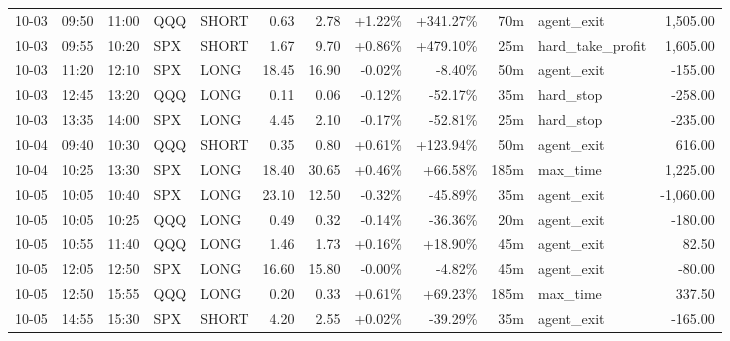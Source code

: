 \documentclass[11pt,a4paper,twoside]{article}
\begin{document}
\begin{center}
\begin{longtable}{>{\color{txtmain}}l l l l l r r r r r >{\color{txtmain}}l r}
10-03 & 09:50 & 11:00 & QQQ & SHORT & 0.63 & 2.78 & \textcolor{wingreen}{+1.22\%} & \textcolor{wingreen}{+341.27\%} & 70m & agent\_exit & \textcolor{wingreen}{1,505.00} \\
10-03 & 09:55 & 10:20 & SPX & SHORT & 1.67 & 9.70 & \textcolor{wingreen}{+0.86\%} & \textcolor{wingreen}{+479.10\%} & 25m & hard\_take\_profit & \textcolor{wingreen}{1,605.00} \\
10-03 & 11:20 & 12:10 & SPX & LONG & 18.45 & 16.90 & \textcolor{lossred}{-0.02\%} & \textcolor{lossred}{-8.40\%} & 50m & agent\_exit & \textcolor{lossred}{-155.00} \\
10-03 & 12:45 & 13:20 & QQQ & LONG & 0.11 & 0.06 & \textcolor{lossred}{-0.12\%} & \textcolor{lossred}{-52.17\%} & 35m & hard\_stop & \textcolor{lossred}{-258.00} \\
10-03 & 13:35 & 14:00 & SPX & LONG & 4.45 & 2.10 & \textcolor{lossred}{-0.17\%} & \textcolor{lossred}{-52.81\%} & 25m & hard\_stop & \textcolor{lossred}{-235.00} \\
10-04 & 09:40 & 10:30 & QQQ & SHORT & 0.35 & 0.80 & \textcolor{wingreen}{+0.61\%} & \textcolor{wingreen}{+123.94\%} & 50m & agent\_exit & \textcolor{wingreen}{616.00} \\
10-04 & 10:25 & 13:30 & SPX & LONG & 18.40 & 30.65 & \textcolor{wingreen}{+0.46\%} & \textcolor{wingreen}{+66.58\%} & 185m & max\_time & \textcolor{wingreen}{1,225.00} \\
10-05 & 10:05 & 10:40 & SPX & LONG & 23.10 & 12.50 & \textcolor{lossred}{-0.32\%} & \textcolor{lossred}{-45.89\%} & 35m & agent\_exit & \textcolor{lossred}{-1,060.00} \\
10-05 & 10:05 & 10:25 & QQQ & LONG & 0.49 & 0.32 & \textcolor{lossred}{-0.14\%} & \textcolor{lossred}{-36.36\%} & 20m & agent\_exit & \textcolor{lossred}{-180.00} \\
10-05 & 10:55 & 11:40 & QQQ & LONG & 1.46 & 1.73 & \textcolor{wingreen}{+0.16\%} & \textcolor{wingreen}{+18.90\%} & 45m & agent\_exit & \textcolor{wingreen}{82.50} \\
10-05 & 12:05 & 12:50 & SPX & LONG & 16.60 & 15.80 & \textcolor{lossred}{-0.00\%} & \textcolor{lossred}{-4.82\%} & 45m & agent\_exit & \textcolor{lossred}{-80.00} \\
10-05 & 12:50 & 15:55 & QQQ & LONG & 0.20 & 0.33 & \textcolor{wingreen}{+0.61\%} & \textcolor{wingreen}{+69.23\%} & 185m & max\_time & \textcolor{wingreen}{337.50} \\
10-05 & 14:55 & 15:30 & SPX & SHORT & 4.20 & 2.55 & \textcolor{wingreen}{+0.02\%} & \textcolor{lossred}{-39.29\%} & 35m & agent\_exit & \textcolor{lossred}{-165.00} \\

\end{longtable}
\end{center}
\end{document}
